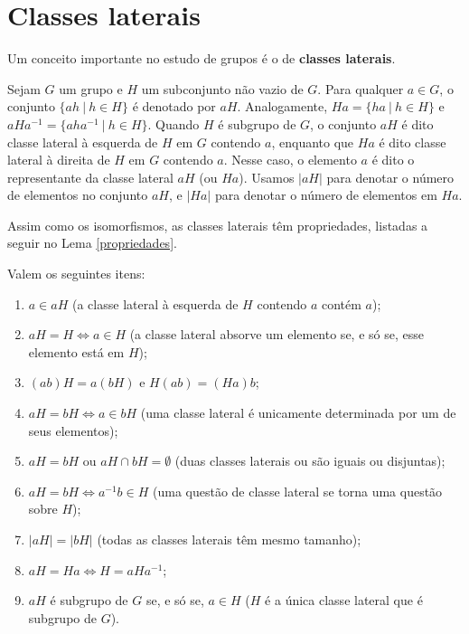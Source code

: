 \section{Classes laterais}
\label{sec-classes-laterais}
    Um conceito importante no estudo de grupos é o de 
    \textbf{classes laterais}.
	\begin{definition}
		\label{def classes laterais}
		Sejam $G$ um grupo e $H$ um subconjunto não vazio de $G$. 
		Para qualquer $a\in G$,	o conjunto $\{ah \ | \ h \in H \}$ é 
		denotado por $aH$. Analogamente, $Ha = \{ha \ | \ h \in H\}$
		e $aHa^{-1} = \{aha^{-1} \ | \ h \in H\}$. Quando $H$ é subgrupo de $G$,
		o conjunto $aH$ é dito classe lateral à esquerda de $H$ em $G$
		contendo $a$, enquanto que $Ha$ é dito classe lateral à direita 
		de $H$ em $G$ contendo $a$. Nesse caso, o elemento $a$ é dito o
		representante da classe lateral $aH$ (ou $Ha$). Usamos $|aH|$ para
		denotar o número de elementos no conjunto $aH$, e $|Ha|$ para 
		denotar o número de elementos em $Ha$.
	\end{definition}
	Assim como os isomorfismos, as classes laterais têm propriedades, listadas a seguir no Lema \ref{propriedades}.
	\begin{lemma}
	\label{propriedades}
	    Valem os seguintes itens:
		\begin{enumerate}
			\item $a\in aH$ (a classe lateral à esquerda de $H$ contendo 
			$a$ contém $a$); 
			\item $aH = H \iff a\in H$ (a classe lateral absorve um 
			elemento se, e só se, esse elemento está em $H$);
			\item $(ab)H = a(bH)$ e $H(ab) = (Ha)b$;
			\item $aH = bH \iff a\in bH$ (uma classe lateral é unicamente
			determinada por um de seus elementos);
			\item $aH = bH$ ou $aH \cap bH = \emptyset$ (duas classes 
			laterais ou são iguais ou disjuntas);
			\item $aH = bH \iff a^{-1}b\in H$ (uma questão de classe 
			lateral se torna uma questão sobre $H$);
			\item $|aH| = |bH|$ (todas as classes laterais têm mesmo tamanho);
			\item $aH = Ha \iff H = aHa^{-1}$;
			\item $aH$ é subgrupo de $G$ se, e só se, $a\in H$ ($H$ é a 
			única classe lateral que é subgrupo de $G$).
		\end{enumerate}
	\end{lemma}
